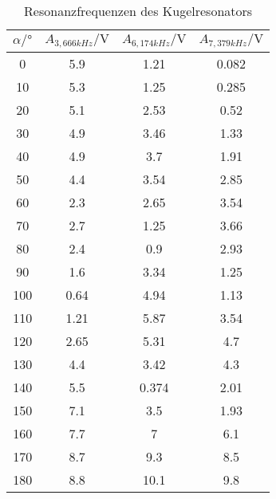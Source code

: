 \begin{table}
    \centering
    \caption{Resonanzfrequenzen des Kugelresonators}
    \label{tab:kugel_resonanz_winkel}
    \begin{tabular}{c c c c}
        \toprule
        $\alpha/°$ & $A_{3,666kHz}/\si{\volt}$ & $A_{6,174kHz}/\si{\volt}$ & $A_{7,379kHz}/\si{\volt}$ \\
        \midrule
        0   &5.9     &1.21    &0.082\\
        10  &5.3     &1.25    &0.285\\
        20  &5.1     &2.53    &0.52\\
        30  &4.9     &3.46    &1.33\\
        40  &4.9     &3.7     &1.91\\
        50  &4.4     &3.54    &2.85\\
        60  &2.3     &2.65    &3.54\\
        70  &2.7     &1.25    &3.66\\
        80  &2.4     &0.9     &2.93\\
        90  &1.6     &3.34    &1.25\\
        100 &0.64    &4.94    &1.13\\
        110 &1.21    &5.87    &3.54\\
        120 &2.65    &5.31    &4.7\\
        130 &4.4     &3.42    &4.3\\
        140 &5.5     &0.374   &2.01\\
        150 &7.1     &3.5     &1.93\\
        160 &7.7     &7       &6.1\\
        170 &8.7     &9.3     &8.5\\
        180 &8.8     &10.1    &9.8\\
        \bottomrule
    \end{tabular}
\end{table}

